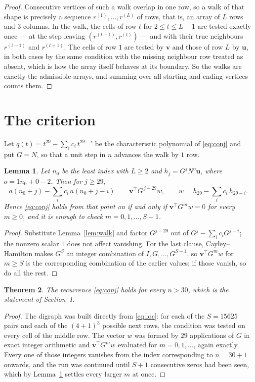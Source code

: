 \documentclass[11pt,a4paper]{article}
\theoremstyle{plain}
\newtheorem{theorem}{Theorem}
\newtheorem{lemma}[theorem]{Lemma}
\theoremstyle{definition}
\begin{document}
\begin{proof}
Consecutive vertices of such a walk overlap in one row, so a walk of that shape is
precisely a sequence $r^{(1)},\dots,r^{(L)}$ of rows, that is, an array of $L$ rows
and $3$ columns. In the walk, the cells of row $t$ for $2\le t\le L-1$ are tested
exactly once --- at the step leaving $(r^{(t-1)},r^{(t)})$ --- and with their true
neighbours $r^{(t-1)}$ and $r^{(t+1)}$. The cells of row $1$ are tested by
$\mathbf{v}$ and those of row $L$ by $\mathbf{u}$, in both cases by the same condition
with the missing neighbour row treated as absent, which is how the array itself behaves at
its boundary. So the walks are exactly the admissible arrays, and summing over all starting
and ending vertices counts them.
\end{proof}

\section{The criterion}

Let $q(t)=t^{29}-\sum_i c_i\,t^{29-i}$ be the characteristic polynomial of
\eqref{eq:conj} and put $G=N$, so that a unit step in $n$ advances the walk by
$1$ row.

\begin{lemma}\label{lem:crit}
Let $n_0$ be the least index with $L\ge2$ and $h_j=G^{j}N^{o}\mathbf{u}$, where
$o=1n_0+0-2$. Then for $j\ge29$,
\[
a(n_0+j)-\sum_i c_i\,a(n_0+j-i)\;=\;\,\mathbf{v}^{\!\top}G^{\,j-29}w,
\qquad w=h_{29}-\sum_i c_i\,h_{29-i} .
\]
Hence \eqref{eq:conj} holds from that point on if and only if
$\mathbf{v}^{\!\top}G^{m}w=0$ for every $m\ge0$, and it is enough to check
$m=0,1,\dots,S-1$.
\end{lemma}

\begin{proof}
Substitute Lemma~\ref{lem:walk} and factor $G^{j-29}$ out of
$G^{j}-\sum_ic_iG^{j-i}$; the nonzero scalar $1$ does not affect
vanishing. For the last clause, Cayley--Hamilton makes $G^{S}$ an integer combination of
$I,G,\dots,G^{S-1}$, so $\mathbf{v}^{\!\top}G^{m}w$ for $m\ge S$ is the corresponding
combination of the earlier values; if those vanish, so do all the rest.
\end{proof}

\begin{theorem}
The recurrence \eqref{eq:conj} holds for every $n>30$, which is the statement of
Section~1.
\end{theorem}

\begin{proof}
The digraph was built directly from \eqref{eq:loc}: for each of the $S=15625$ pairs and each
of the $(4+1)^{3}$ possible next rows, the condition was tested on every cell of
the middle row. The vector $w$ was formed by $29$ applications of $G$ in exact integer
arithmetic and $\mathbf{v}^{\!\top}G^{m}w$ evaluated for $m=0,1,\dots$, again exactly.
Every one of those integers vanishes from the index corresponding to $n=30+1$ onwards,
and the run was continued until $S+1$ consecutive zeros had been seen, which by
Lemma~\ref{lem:crit} settles every larger $m$ at once.
\end{proof}
\end{document}

